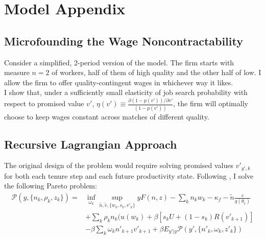 \appendix
\section{Model Appendix} 

\subsection{Microfounding the Wage Noncontractability} \label{microfoundation}
Consider a simplified, 2-period version of the model. The firm starts with measure $n=2$ of workers, half of them of high quality and the other half of low. I allow the firm to offer quality-contingent wages in whichever way it likes. \\
I show that, under a sufficiently small elasticity of job search probability with respect to promised value $v'$, $\eta(v')\equiv\frac{\partial (1-p(v')) /\partial v'}{(1-p(v'))}$, the firm will optimally choose to keep wages constant across matches of different quality.
\subsection{Recursive Lagrangian Approach} \label{dual}
The original design of the problem would require solving promised values $v'_{y',k}$ for both each tenure step and each future productivity state. Following \textcite{balke2022}, I solve the following Pareto problem:
\begin{equation*}
\begin{split}
\mathcal{P}(y,\{n_k,\rho_k,z_k\}) = &\inf_{\omega_k} \sup_{\tilde{n},\tilde{v},\{w_k,s_k,v'_k\}}  yF(n,z) - \sum_k n_kw_k - \kappa_f - \tilde{n}\frac{c}{q(\theta_{\tilde{v}})}   \\
& + \sum_k\rho_kn_k(u(w_k)+\beta[s_kU+(1-s_k)R(v'_{k+1})] \\
& -\beta\sum_k \omega_kn'_{k+1} v'_{k+1}+\beta E_{y'|y}\mathcal{P}(y',\{n'_k,\omega_k,z'_k\})    
\end{split}
\end{equation*}

